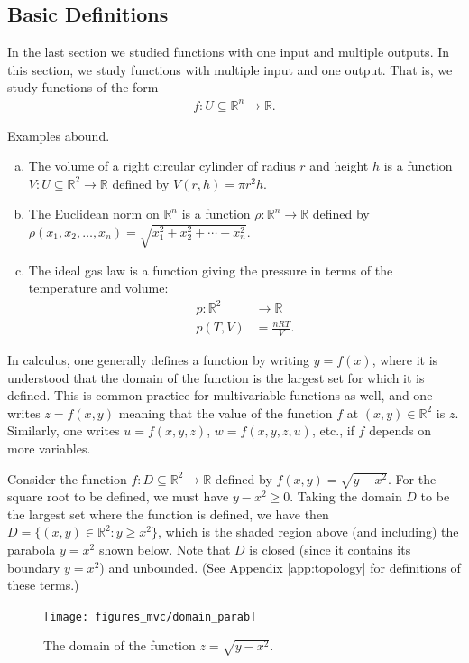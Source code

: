 \documentclass[12pt,letterpaper,reqno]{article}
\numberwithin{equation}{section}
\newcommand{\R}{\ensuremath{\mathbb R}}
\begin{document}
{\subsection{Basic Definitions}
In the last section we studied functions with one input and multiple outputs. In this section, we study functions with multiple input and one output. That is, we study functions of the form
\begin{align*}
	f:U \subseteq \R^n \to \R.
\end{align*}

Examples abound.

\begin{example}
\begin{enumerate}[(a)]
	\item The volume of a right circular cylinder of radius $r$ and height $h$ is a function $V:U \subseteq \R^2 \to \R$ defined by $V(r,h)=\pi r^2h$.
	\item The Euclidean norm on $\R^n$ is a function $\rho:\R^n \to \R$ defined by $\rho(x_1,x_2,\dots,x_n)=\sqrt{x_1^2+x_2^2+\cdots+x_n^2}$.
	\item The ideal gas law is a function giving the pressure in terms of the temperature and volume:
	\begin{align*} 
		p:\R^2 &\to \R\\
		p(T,V)&=\frac{nRT}{V}.
	\end{align*}
\end{enumerate}	
\end{example}
In calculus, one generally defines a function by writing $y=f(x)$, where it is understood that the domain of the function is the largest set for which it is defined. This is common practice for multivariable functions as well, and one writes $z=f(x,y)$ meaning that the value of the function $f$ at $(x,y) \in \R^2$ is $z$. Similarly, one writes $u=f(x,y,z)$, $w=f(x,y,z,u)$, etc., if $f$ depends on more variables.

\begin{example}
Consider the function $f:D \subseteq \R^2 \to \R$ defined by $f(x,y)=\sqrt{y-x^2}$. For the square root to be defined, we must have $y-x^2\geq 0$. Taking the domain $D$ to be the largest set where the function is defined, we have then $D=\{(x,y) \in \R^2:y \geq x^2\}$, which is the shaded region above (and including) the parabola $y=x^2$ shown below. Note that $D$ is closed (since it contains its boundary $y=x^2$) and unbounded. (See Appendix \ref{app:topology} for definitions of these terms.)
\begin{figure}[h]
	\begin{center}
		\texttt{[image: figures\_mvc/domain\_parab]}
	\end{center}
	\caption{The domain of the function $z=\sqrt{y-x^2}$.}
\end{figure}
\end{example}

}
\end{document}
